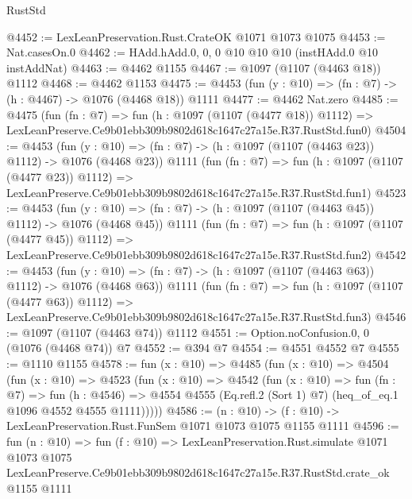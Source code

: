 \begin{lexlean}{RustStd}
\begin{coremodule}
@4452 := LexLeanPreservation.Rust.CrateOK @1071 @1073 @1075
@4453 := Nat.casesOn.{0}
@4462 := HAdd.hAdd.{0, 0, 0} @10 @10 @10 (instHAdd.{0} @10 instAddNat)
@4463 := @4462 @1155
@4467 := @1097 (@1107 (@4463 @18)) @1112
@4468 := @4462 @1153
@4475 := @4453 (fun (y : @10) => (fn : @7) -> (h : @4467) -> @1076 (@4468 @18)) @1111
@4477 := @4462 Nat.zero
@4485 := @4475
    (fun (fn : @7) =>
    fun (h : @1097 (@1107 (@4477 @18)) @1112) =>
    LexLeanPreserve.Ce9b01ebb309b9802d618c1647c27a15e.R37.RustStd.fun0)
@4504 := @4453
    (fun (y : @10) => (fn : @7) -> (h : @1097 (@1107 (@4463 @23)) @1112) -> @1076 (@4468 @23))
    @1111
    (fun (fn : @7) =>
    fun (h : @1097 (@1107 (@4477 @23)) @1112) =>
    LexLeanPreserve.Ce9b01ebb309b9802d618c1647c27a15e.R37.RustStd.fun1)
@4523 := @4453
    (fun (y : @10) => (fn : @7) -> (h : @1097 (@1107 (@4463 @45)) @1112) -> @1076 (@4468 @45))
    @1111
    (fun (fn : @7) =>
    fun (h : @1097 (@1107 (@4477 @45)) @1112) =>
    LexLeanPreserve.Ce9b01ebb309b9802d618c1647c27a15e.R37.RustStd.fun2)
@4542 := @4453
    (fun (y : @10) => (fn : @7) -> (h : @1097 (@1107 (@4463 @63)) @1112) -> @1076 (@4468 @63))
    @1111
    (fun (fn : @7) =>
    fun (h : @1097 (@1107 (@4477 @63)) @1112) =>
    LexLeanPreserve.Ce9b01ebb309b9802d618c1647c27a15e.R37.RustStd.fun3)
@4546 := @1097 (@1107 (@4463 @74)) @1112
@4551 := Option.noConfusion.{0, 0} (@1076 (@4468 @74)) @7
@4552 := @394 @7
@4554 := @4551 @4552 @7
@4555 := @1110 @1155
@4578 := fun (x : @10) =>
  @4485
    (fun (x : @10) =>
    @4504
      (fun (x : @10) =>
      @4523
        (fun (x : @10) =>
        @4542
          (fun (x : @10) =>
          fun (fn : @7) =>
          fun (h : @4546) =>
          @4554 @4555 (Eq.refl.{2} (Sort 1) @7) (heq_of_eq.{1} @1096 @4552 @4555 @1111)))))
@4586 := (n : @10) -> (f : @10) -> LexLeanPreservation.Rust.FunSem @1071 @1073 @1075 @1155 @1111
@4596 := fun (n : @10) =>
  fun (f : @10) =>
  LexLeanPreservation.Rust.simulate
    @1071
    @1073
    @1075
    LexLeanPreserve.Ce9b01ebb309b9802d618c1647c27a15e.R37.RustStd.crate_ok
    @1155
    @1111
\end{coremodule}
\end{lexlean}
